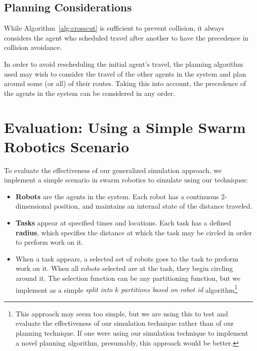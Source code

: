 \documentclass[conference,letterpaper]{IEEEtran}
\begin{document}
\subsection{Planning Considerations}

While Algorithm~\ref{alg:crosscut} is sufficient to prevent collision, it
always considers the agent who scheduled travel after another to have the
precedence in collision avoidance.

In order to avoid rescheduling the initial agent's travel, the planning
algorithm used may wish to consider the travel of the other agents in the
system and plan around some (or all) of their routes. Taking this into account,
the precedence of the agents in the system can be considered in any order.

\section{Evaluation: Using a Simple Swarm Robotics Scenario}
\label{sec:evaluation}

To evaluate the effectiveness of our generalized simulation approach, we
implement a simple scenario in swarm robotics to simulate using our techniques:
\begin{itemize}
    \item \textbf{Robots} are the agents in the system. Each robot has a
        continuous 2-dimensional position, and maintains an internal state of
        the distance traveled.
    \item \textbf{Tasks} appear at specified times and locations. Each task has
        a defined \textbf{radius}, which specifies the distance at which the
        task may be circled in order to preform work on it.
    \item When a task appears, a selected set of robots goes to the task to
        preform work on it. When all robots selected are at the task, they
        begin circling around it. The selection function can be any
        partitioning function, but we implement as a simple \emph{split into
        $k$ partitions based on robot id} algorithm\footnote{This approach may
        seem too simple, but we are using this to test and evaluate the
        effectiveness of our simulation technique rather than of our planning
        technique. If one were using our simulation technique to implement a
        novel planning algorithm, presumably, this approach would be better.}
\end{itemize}
\end{document}
